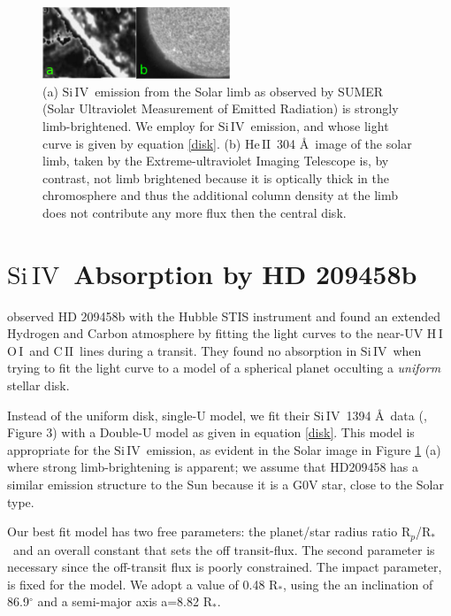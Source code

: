 \documentclass[manuscript]{aastex}
\newcommand{\cii}{\ensuremath{\mathrm{C}\,\scriptstyle \mathrm{II}}}
\newcommand{\oi}{\ensuremath{\mathrm{O}\,\scriptstyle \mathrm{I}}}
\newcommand{\hi}{\ensuremath{\mathrm{H}\,\scriptstyle \mathrm{I}}}
\newcommand{\heII}{\ensuremath{\mathrm{He}\,\scriptstyle \mathrm{II}}}
\newcommand{\siIV}{\ensuremath{\mathrm{Si}\,\scriptstyle \mathrm{IV}}}
\newcommand{\p}{R$_p$/R$_*$}
\begin{document}
\begin{figure}
\begin{center}
\includegraphics[width=0.5\textwidth]{limb_compare_siIV_heII.eps}
\caption{(a) \siIV\ emission from the Solar limb as observed by SUMER (Solar Ultraviolet Measurement of Emitted Radiation) \citep{wiik} is strongly limb-brightened. We employ for \siIV\ emission, and whose light curve is given by  equation \ref{disk}. (b) \heII\ 304 \AA\ image of the solar limb, taken by the Extreme-ultraviolet Imaging Telescope \citep{feldman} is, by contrast, not limb brightened because it is optically thick in the chromosphere and thus the additional column density at the limb does not contribute any more flux then the central disk.}
\label{limbs}
\end{center}
\end{figure}

\section{\siIV\ Absorption by HD 209458b} \label{osiris}

\citet{viddisc} observed HD 209458b with the Hubble STIS instrument and found
an extended Hydrogen and Carbon atmosphere by fitting the light curves
to the near-UV \hi\, \oi\ and \cii\ lines during a transit. They found no absorption in \siIV\ when trying to fit the light curve to a model of a spherical planet occulting a {\it uniform} stellar disk.

Instead of the uniform disk, single-U model, we fit their \siIV\ 1394 \AA\ data (\citet{vidmad}, Figure 3) with a Double-U model as given in equation \ref{disk}. This model is appropriate for the \siIV\ emission, as evident in the Solar image in Figure \ref{limbs} (a) where strong limb-brightening is apparent; we assume that HD209458 has a similar emission structure to the Sun because it is a G0V star, close to the Solar type.

Our best fit model has two free parameters: the planet/star radius ratio \p\ and an overall constant that sets the off transit-flux. The second parameter is necessary since the off-transit flux is poorly constrained. The impact parameter, 
 is fixed for the model. We adopt a value of 0.48 R$_*$, using the an inclination of 86.9$^\circ$ \citep{knutsonprop} and a semi-major axis a=8.82 R$_*$.
\end{document}
